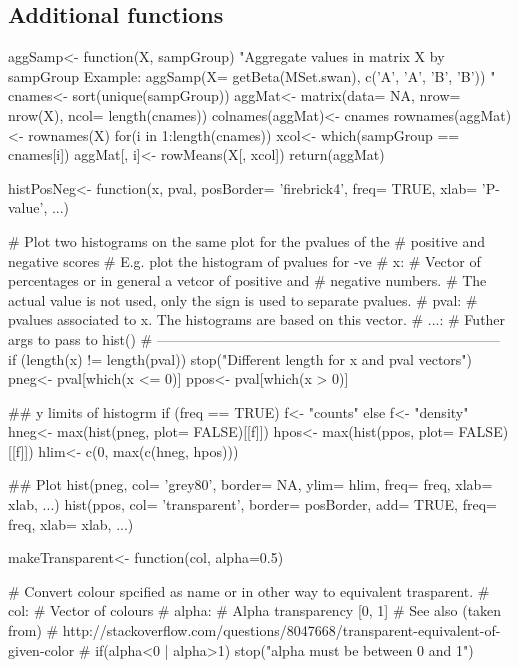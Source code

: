\subsection{Additional functions} 
\label{sec:additionalFunctions}

\begin{sverbatim} %

aggSamp<- function(X, sampGroup) {
    "Aggregate values in matrix X by sampGroup
    Example:
        aggSamp(X= getBeta(MSet.swan), c('A', 'A', 'B', 'B'))
    " 
    cnames<- sort(unique(sampGroup))
    aggMat<- matrix(data= NA, nrow= nrow(X), ncol= length(cnames))
    colnames(aggMat)<- cnames
    rownames(aggMat)<- rownames(X)
    for(i in 1:length(cnames)){
        xcol<- which(sampGroup == cnames[i])
        aggMat[, i]<- rowMeans(X[, xcol])
    }
    return(aggMat)
}

histPosNeg<- function(x, pval, posBorder= 'firebrick4', 
	freq= TRUE, xlab= 'P-value', ...){
    # Plot two histograms on the same plot for the pvalues of the 
    # positive and negative scores
    # E.g. plot the histogram of pvalues for -ve %
    # x:
    #   Vector of percentages or in general a vetcor of positive and 
    #   negative numbers.
    #   The actual value is not used, only the sign is used to separate pvalues.
    # pval:
    #   pvalues associated to x. The histograms are based on this vector.
    # ...:
    #   Futher args to pass to hist()
    # --------------------------------------------------------------------------
    if (length(x) != length(pval)){
        stop("Different length for x and pval vectors")
    }
    pneg<- pval[which(x <= 0)]
    ppos<- pval[which(x > 0)]
    
    ## y limits of histogrm
    if (freq == TRUE){
        f<- "counts"
    } else {
        f<- "density"
    }
    hneg<- max(hist(pneg, plot= FALSE)[[f]])
    hpos<- max(hist(ppos, plot= FALSE)[[f]])
    hlim<- c(0, max(c(hneg, hpos)))
    
    ## Plot
    hist(pneg, col= 'grey80', border= NA, ylim= hlim, freq= freq, xlab= xlab, ...)
    hist(ppos, col= 'transparent', border= posBorder, add= TRUE, 
    	freq= freq, xlab= xlab, ...)
}

makeTransparent<- function(col, alpha=0.5) {
  # Convert colour spcified as name or in other way to equivalent trasparent.
  # col:
  #    Vector of colours
  # alpha:
  #   Alpha transparency [0, 1]
  # See also (taken from)
  # http://stackoverflow.com/questions/8047668/transparent-equivalent-of-given-color
  #
  if(alpha<0 | alpha>1) stop("alpha must be between 0 and 1")

}
\end{sverbatim}
